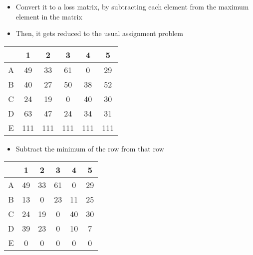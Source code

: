 \documentclass[12pt]{beamer}
\begin{document}
\begin{frame}
\begin{itemize}
\item Convert it to a loss matrix, by subtracting each element from the maximum element in the matrix
\item Then, it gets reduced to the usual assignment problem
\end{itemize}
\begin{center}
\begin{tabular}{|c|ccccc|}
\hline
  & 1   & 2   & 3   & 4   & 5   \\
\hline
A & 49  & 33  & 61  & 0   & 29  \\
B & 40  & 27  & 50  & 38  & 52  \\
C & 24  & 19  & 0   & 40  & 30  \\
D & 63  & 47  & 24  & 34  & 31  \\
E & 111 & 111 & 111 & 111 & 111 \\
\hline
\end{tabular}
\end{center}
\end{frame}

\begin{frame}
\begin{itemize}
\item Subtract the minimum of the row from that row
\end{itemize}
\begin{center}
\begin{tabular}{|c|ccccc|}
\hline
  & 1  & 2  & 3  & 4  & 5  \\
\hline
A & 49 & 33 & 61 & 0  & 29 \\
B & 13 & 0  & 23 & 11 & 25 \\
C & 24 & 19 & 0  & 40 & 30 \\
D & 39 & 23 & 0  & 10 & 7  \\
E & 0  & 0  & 0  & 0  & 0  \\
\hline
\end{tabular}
\end{center}
\end{frame}
\end{document}
